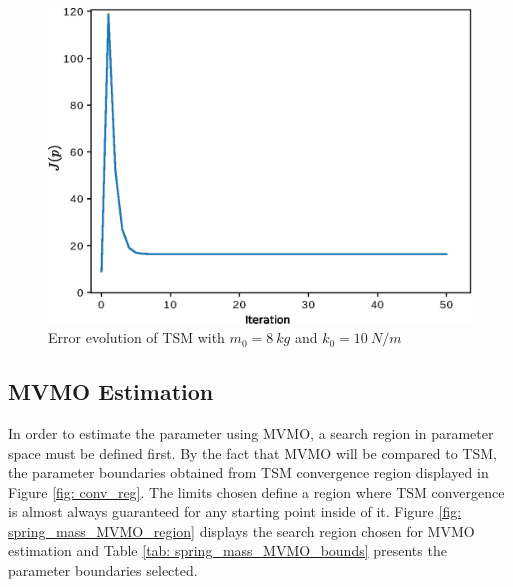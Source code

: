 \begin{figure}[h]
	\caption{Error evolution of TSM with $m_{0} = 8\ kg$ and $k_{0} = 10\ N/m$}
	\begin{center}
		\includegraphics[scale=0.6]{Images/TS_nconv.eps}
	\end{center}
	\label{fig: TS_nconv}
\end{figure}

\subsection{MVMO Estimation}

In order to estimate the parameter using MVMO, a search region in parameter space must be defined first. By the fact that MVMO will be compared to TSM, the parameter boundaries obtained from TSM convergence region displayed in Figure \ref{fig: conv_reg}. The limits chosen define a region where TSM convergence is almost always guaranteed for any starting point inside of it. Figure \ref{fig: spring_mass_MVMO_region} displays the search region chosen for MVMO estimation and Table \ref{tab: spring_mass_MVMO_bounds} presents the parameter boundaries selected.

